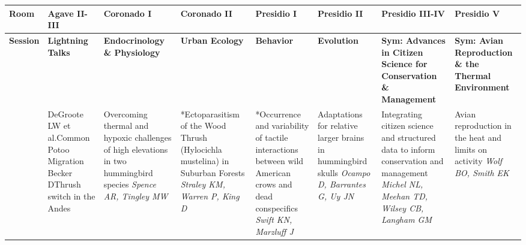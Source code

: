 \begin{tabular}{|x{0.85cm}|x{2.85cm}|x{2.85cm}|x{2.85cm}|x{2.85cm}|x{2.85cm}|a{2.85cm}|a{2.85cm}|}\hline
Room & Agave II-III & Coronado I & Coronado II & Presidio I & Presidio II & Presidio III-IV & Presidio V\\
\hline
\rule{0pt}{1em} \textbf{Session} &\footnotesize \textbf{Lightning Talks} & \footnotesize \textbf{Endocrinology \& Physiology} & \footnotesize \textbf{Urban Ecology} & \footnotesize \textbf{Behavior} & \footnotesize \textbf{Evolution} & \footnotesize \textbf{Sym: Advances in Citizen Science for Conservation \& Management} & \footnotesize \textbf{Sym: Avian Reproduction \& the Thermal Environment}\\
\hline
{}&\newline \tiny  \scriptsize\newline \newline DeGroote LW  et al.\newline \tiny Common Potoo Migration \scriptsize\newline \newline Becker D\newline \tiny Thrush switch in the Andes \scriptsize & Overcoming thermal and hypoxic challenges of high elevations in two hummingbird species \newline \newline \textit{Spence AR, Tingley MW} & *Ectoparasitism of the Wood Thrush (Hylocichla mustelina) in Suburban Forests \newline \newline \textit{Straley KM, Warren P, King D} & *Occurrence and variability of tactile interactions between wild American crows and dead conspecifics \newline \newline \textit{Swift KN, Marzluff J} & Adaptations for relative larger brains in hummingbird skulls \newline \newline \textit{Ocampo D, Barrantes G, Uy JN} & Integrating citizen science and structured data to inform conservation and management \newline \newline \textit{Michel NL, Meehan TD, Wilsey CB, Langham GM} & Avian reproduction in the heat and limits on activity \newline \newline \textit{Wolf BO, Smith EK}\\

\end{tabular}
